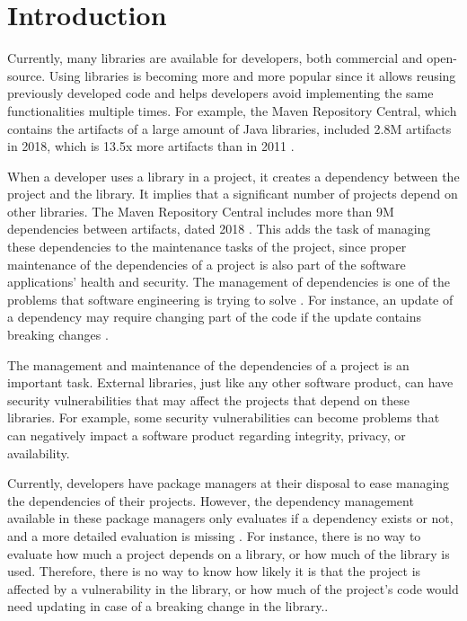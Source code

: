 \chapter{Introduction}\label{ch:Introduction}

Currently, many libraries are available for developers, both commercial and open-source. Using libraries is becoming more and more popular \cite{kikas2017structure} since it allows reusing previously developed code and helps developers avoid implementing the same functionalities multiple times. For example, the Maven Repository Central, which contains the artifacts of a large amount of Java libraries, included 2.8M artifacts in 2018, which is 13.5x more artifacts than in 2011  \cite{Benelallam2019}.

When a developer uses a library in a project, it creates a dependency between the project and the library. It implies that a significant number of projects depend on other libraries. The Maven Repository Central includes more than 9M dependencies between artifacts, dated 2018 \cite{Benelallam2019}. This adds the task of managing these dependencies to the maintenance tasks of the project, since proper maintenance of the dependencies of a project is also part of the software applications' health and security. The management of dependencies is one of the problems that software engineering is trying to solve \cite{kula2014visualizing}. For instance, an update of a dependency may require changing part of the code if the update contains breaking changes \cite{Raemaekers2017}.

The management and maintenance of the dependencies of a project is an important task. External libraries, just like any other software product, can have security vulnerabilities that may affect the projects that depend on these libraries. For example, some security vulnerabilities can become problems that can negatively impact a software product regarding integrity, privacy, or availability.

\blankl
Currently, developers have package managers at their disposal to ease managing the dependencies of their projects. However, the dependency management available in these package managers only evaluates if a dependency exists or not, and a more detailed evaluation is missing \cite{hejderup2018prazi}. For instance, there is no way to evaluate how much a project depends on a library, or how much of the library is used. Therefore, there is no way to know how likely it is that the project is affected by a vulnerability in the library, or how much of the project's code would need updating in case of a breaking change in the library..

